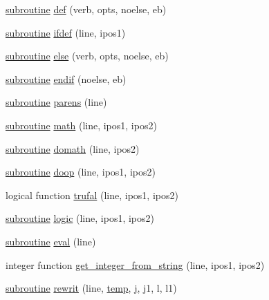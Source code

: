 \begin{DoxyCompactItemize}
\hyperlink{M__stopwatch_83_8txt_acfbcff50169d691ff02d4a123ed70482}{subroutine} \hyperlink{namespacem__fpp_af80169d1e05b926eed9d4dbe10963084}{def} (verb, opts, noelse, eb)
\item 
\hyperlink{M__stopwatch_83_8txt_acfbcff50169d691ff02d4a123ed70482}{subroutine} \hyperlink{namespacem__fpp_acc125ade915dbf457a06801f2e241306}{ifdef} (line, ipos1)
\item 
\hyperlink{M__stopwatch_83_8txt_acfbcff50169d691ff02d4a123ed70482}{subroutine} \hyperlink{namespacem__fpp_aa7ce8afa566111e9b6f86922b9ec3205}{else} (verb, opts, noelse, eb)
\item 
\hyperlink{M__stopwatch_83_8txt_acfbcff50169d691ff02d4a123ed70482}{subroutine} \hyperlink{namespacem__fpp_a943f646c7373dc0d88d4e6fe905fd90f}{endif} (noelse, eb)
\item 
\hyperlink{M__stopwatch_83_8txt_acfbcff50169d691ff02d4a123ed70482}{subroutine} \hyperlink{namespacem__fpp_a4b9be76f637b58b358ee2a9ec95db933}{parens} (line)
\item 
\hyperlink{M__stopwatch_83_8txt_acfbcff50169d691ff02d4a123ed70482}{subroutine} \hyperlink{namespacem__fpp_a7fe1c908c17895ebaa5afc2dc4cd1f1f}{math} (line, ipos1, ipos2)
\item 
\hyperlink{M__stopwatch_83_8txt_acfbcff50169d691ff02d4a123ed70482}{subroutine} \hyperlink{namespacem__fpp_acf16ae34a4c7e769114656c3dbbe0640}{domath} (line, ipos2)
\item 
\hyperlink{M__stopwatch_83_8txt_acfbcff50169d691ff02d4a123ed70482}{subroutine} \hyperlink{namespacem__fpp_a56d098fa1c69f9afbfbf0aacceed9fff}{doop} (line, ipos1, ipos2)
\item 
logical function \hyperlink{namespacem__fpp_ad7c4d8aa34d0b35cd3b3ced65e261590}{trufal} (line, ipos1, ipos2)
\item 
\hyperlink{M__stopwatch_83_8txt_acfbcff50169d691ff02d4a123ed70482}{subroutine} \hyperlink{namespacem__fpp_ae036546bab009c772421d3f4e34ca93c}{logic} (line, ipos1, ipos2)
\item 
\hyperlink{M__stopwatch_83_8txt_acfbcff50169d691ff02d4a123ed70482}{subroutine} \hyperlink{namespacem__fpp_a7f223128c476778fa0334675c1431371}{eval} (line)
\item 
integer function \hyperlink{namespacem__fpp_a3293bb9a959675261bda2b8f6fe3fa9e}{get\+\_\+integer\+\_\+from\+\_\+string} (line, ipos1, ipos2)
\item 
\hyperlink{M__stopwatch_83_8txt_acfbcff50169d691ff02d4a123ed70482}{subroutine} \hyperlink{namespacem__fpp_aae0bad1c7d831068e28f5658d3e1827c}{rewrit} (line, \hyperlink{temp_8f90_ae3dd9015488975da65db0e05e1d019c3}{temp}, \hyperlink{exit_87_8txt_a8921ef29c441e427867c54bd3b2462ba}{j}, j1, l, l1)

\end{DoxyCompactItemize}

